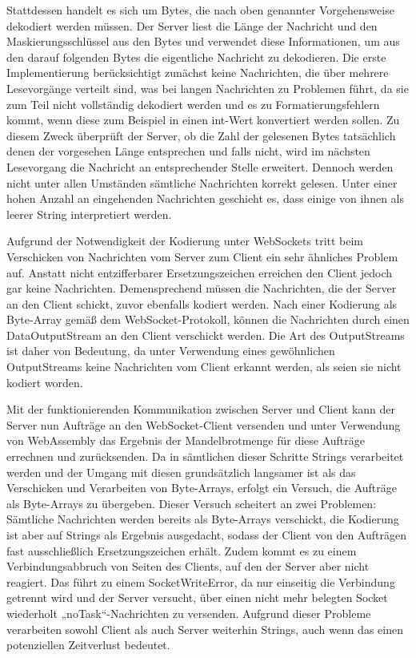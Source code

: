\documentclass[12pt, onecolumn,notitlepage]{scrartcl}
\begin{document}
Stattdessen handelt es sich um Bytes, die nach oben genannter Vorgehensweise dekodiert werden müssen. Der Server liest die Länge der Nachricht und den Maskierungsschlüssel aus den Bytes und verwendet diese Informationen, um aus den darauf folgenden Bytes die eigentliche Nachricht zu dekodieren. Die erste Implementierung berücksichtigt zunächst keine Nachrichten, die über mehrere Lesevorgänge verteilt sind, was bei langen Nachrichten zu Problemen führt, da sie zum Teil nicht vollständig dekodiert werden und es zu Formatierungsfehlern kommt, wenn diese zum Beispiel in einen int-Wert konvertiert werden sollen. Zu diesem Zweck überprüft der Server, ob die Zahl der gelesenen Bytes tatsächlich denen der vorgesehen Länge entsprechen und falls nicht, wird im nächsten Lesevorgang die Nachricht an entsprechender Stelle erweitert. Dennoch werden nicht unter allen Umständen sämtliche Nachrichten korrekt gelesen. Unter einer hohen Anzahl an eingehenden Nachrichten geschieht es, dass einige von ihnen als leerer String interpretiert werden. \par

Aufgrund der Notwendigkeit der Kodierung unter WebSockets tritt beim Verschicken von Nachrichten vom Server zum Client ein sehr ähnliches Problem auf. Anstatt nicht entzifferbarer Ersetzungszeichen erreichen den Client jedoch gar keine Nachrichten. Demensprechend müssen die Nachrichten, die der Server an den Client schickt, zuvor ebenfalls kodiert werden. Nach einer Kodierung als Byte-Array gemäß dem WebSocket-Protokoll, können die Nachrichten durch einen DataOutputStream an den Client verschickt werden. Die Art des OutputStreams ist daher von Bedeutung, da unter Verwendung eines gewöhnlichen OutputStreams keine Nachrichten vom Client erkannt werden, als seien sie nicht kodiert worden. \par

Mit der funktionierenden Kommunikation zwischen Server und Client kann der Server nun Aufträge an den WebSocket-Client versenden und unter Verwendung von WebAssembly das Ergebnis der Mandelbrotmenge für diese Aufträge errechnen und zurücksenden. Da in sämtlichen dieser Schritte Strings verarbeitet werden und der Umgang mit diesen grundsätzlich langsamer ist als das Verschicken und Verarbeiten von Byte-Arrays, erfolgt ein Versuch, die Aufträge als Byte-Arrays zu übergeben. Dieser Versuch scheitert an zwei Problemen: Sämtliche Nachrichten werden bereits als Byte-Arrays verschickt, die Kodierung ist aber auf Strings als Ergebnis ausgedacht, sodass der Client von den Aufträgen fast ausschließlich Ersetzungszeichen erhält. Zudem kommt es zu einem Verbindungsabbruch von Seiten des Clients, auf den der Server aber nicht reagiert. Das führt zu einem SocketWriteError, da nur einseitig die Verbindung getrennt wird und der Server versucht, über einen nicht mehr belegten Socket wiederholt „noTask“-Nachrichten zu versenden. Aufgrund dieser Probleme verarbeiten sowohl Client als auch Server weiterhin Strings, auch wenn das einen potenziellen Zeitverlust bedeutet. \par
\end{document}
